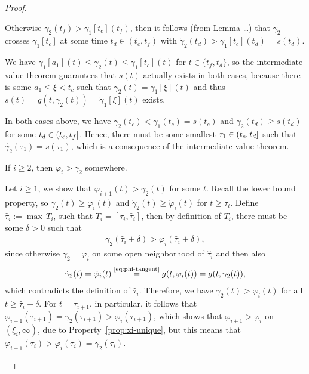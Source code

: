 \documentclass[a4paper]{article}
\theoremstyle{definition}
\theoremstyle{plain}
\begin{document}
\begin{proof}
\begin{outline}
  \2 Otherwise $\gamma_{2}(t_{f}) > \gamma_{1}[t_{c}](t_{f})$, then it follows
  (from Lemma \dots) that $\gamma_{2}$ crosses $\gamma_{1}[t_{c}]$ at some time
  $t_{d} \in (t_{c}, t_{f})$ with
  $\dot{\gamma}_{2}(t_{d}) > \gamma_{1}[t_{c}](t_{d}) = s(t_{d})$.

  \2 We have $\gamma_{1}[a_{1}](t) \leq \gamma_{2}(t) \leq \gamma_{1}[t_{c}](t)$ for
  $t \in \{ t_{f}, t_{d} \}$, so the intermediate value theorem guarantees that
  $s(t)$ actually exists in both cases, because there is some
  $a_{1} \leq \xi < t_{c}$ such that $\gamma_{2}(t) = \gamma_{1}[\xi](t)$ and thus
  $s(t) = g(t, \gamma_{2}(t)) = \dot{\gamma}_{1}[\xi](t)$ exists.

  \2 In both cases above, we have
  $\dot{\gamma}_{2}(t_{c}) < \dot{\gamma}_{1}(t_{c}) = s(t_{c})$ and
  $\dot{\gamma}_{2}(t_{d}) \geq s(t_{d})$ for some $t_{d} \in (t_{c},t_{f}]$.
  Hence, there must be some smallest $\tau_{1} \in (t_{c},t_{d}]$ such that
  $\dot{\gamma_{2}}(\tau_{1}) = s(\tau_{1})$, which is a consequence of the intermediate
  value theorem.

  \1 If $i \geq 2$, then $\varphi_{i} > \gamma_{2}$ somewhere.

  \2 Let $i \geq 1$, we show that $\varphi_{i+1}(t) > \gamma_{2}(t)$ for some $t$.
  Recall the lower bound property, so $\gamma_{2}(t) \geq \varphi_{i}(t)$ and
  $\dot{\gamma}_{2}(t) \geq \dot{\varphi}_{i}(t)$ for $t \geq \tau_{i}$.
  Define $\hat{\tau}_{i} := \max \, T_{i}$, such that
  $T_{i} = [\tau_{i}, \hat{\tau}_{i}]$, then by definition of $T_{i}$, there
  must be some $\delta > 0$ such that
  \begin{align}
    \gamma_{2}(\hat{\tau}_{i} + \delta) > \varphi_{i}(\hat{\tau}_{i} + \delta) ,
  \end{align}
  since otherwise $\gamma_{2} = \varphi_{i}$ on some open neighborhood of
  $\hat{\tau}_{i}$ and then also
  \begin{align}
    \dot{\gamma}_{2}(t) = \dot{\varphi}_{i}(t) \overset{\text{\eqref{eq:phi-tangent}}}{=} g(t, \varphi_{i}(t)) = g(t, \gamma_{2}(t)),
  \end{align}
  which contradicts the definition of $\hat{\tau}_{i}$.
  Therefore, we have $\gamma_{2}(t) > \varphi_{i}(t)$ for all $t \geq \hat{\tau}_{i} + \delta$. For
  $t = \tau_{i+1}$, in particular, it follows that
  $\varphi_{i+1}(\tau_{i+1}) = \gamma_{2}(\tau_{i+1}) > \varphi_{i}(\tau_{i+1})$, which shows that
  $\varphi_{i+1} > \varphi_{i}$ on $(\xi_{i}, \infty)$, due to Property~\ref{prop:xi-unique}, but this means that
  $\varphi_{i+1}(\tau_{i}) > \varphi_{i}(\tau_{i}) = \gamma_{2}(\tau_{i})$.


\end{outline}
\end{proof}
\end{document}
